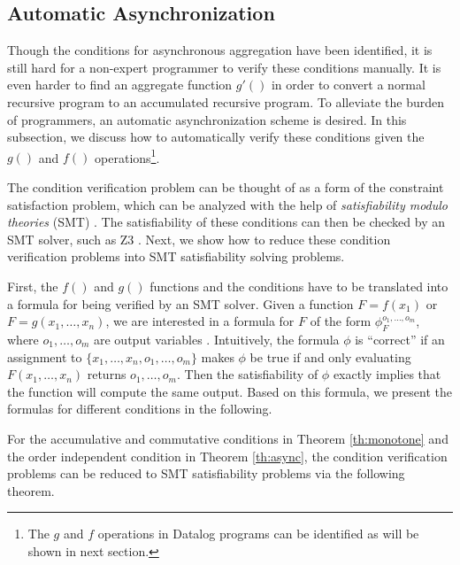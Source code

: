 \documentclass{vldb}
\begin{document}
\subsection{Automatic Asynchronization}
\label{sec:async:autoasync}

Though the conditions for asynchronous aggregation have been identified, it is still hard for a non-expert programmer to verify these conditions manually. It is even harder to find an aggregate function $g'()$ in order to convert a normal recursive program to an accumulated recursive program. To alleviate the burden of programmers, an automatic asynchronization scheme is desired. In this subsection, we discuss how to automatically verify these conditions given the $g()$ and $f()$ operations\footnote{The $g$ and $f$ operations in Datalog programs can be identified as will be shown in next section.}.

The condition verification problem can be thought of as a form of the constraint satisfaction problem, which can be analyzed with the help of \emph{satisfiability modulo theories} (SMT) \cite{53e486195688442995f82bfe28c55731}. The satisfiability of these conditions can then be checked by an SMT solver, such as Z3 \cite{DeMoura:2008:ZES:1792734.1792766}. Next, we show how to reduce these condition verification problems into SMT satisfiability solving problems.

First, the $f()$ and $g()$ functions and the conditions have to be translated into a formula for being verified by an SMT solver. Given a function $F=f(x_1)$ or $F=g(x_1,\ldots,x_n)$, we are interested in a formula for $F$ of the form $\phi_F^{o_1,\ldots,o_m}$, where $o_1,\ldots,o_m$ are output variables \cite{Liu:2014:ADP:2670979.2670980}. Intuitively, the formula $\phi$ is ``correct'' if an assignment to $\{x_1,\ldots,x_n,o_1,\ldots,o_m\}$ makes $\phi$ be true if and only evaluating $F(x_1,\ldots,x_n)$ returns $o_1,\ldots,o_m$. Then the satisfiability of $\phi$ exactly implies that the function will compute the same output. Based on this formula, we present the formulas for different conditions in the following.

For the accumulative and commutative conditions in Theorem \ref{th:monotone} and the order independent condition in Theorem \ref{th:async}, the condition verification problems can be reduced to SMT satisfiability problems via the following theorem.
\end{document}
